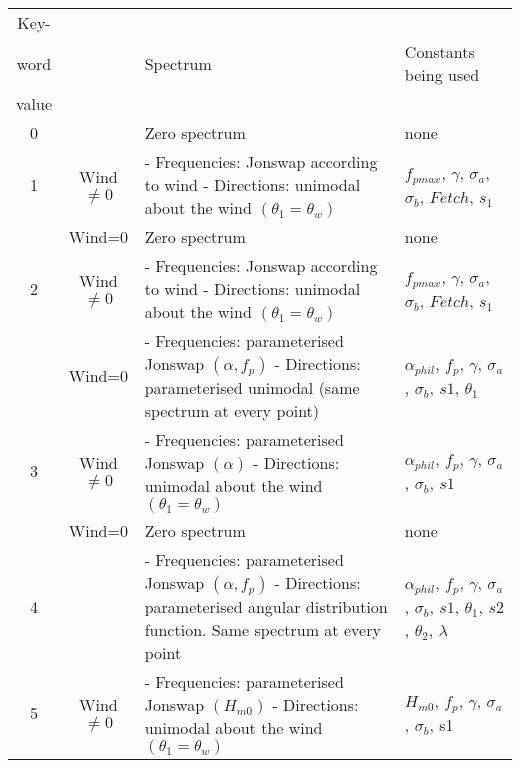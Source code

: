 \begin{table}
\begin{tabular}{|c|c|p{2.2in}|p{1.8in}|} \hline
Key- &  &  &  \\ 
word  &  & Spectrum & Constants  being used \\ 
 value &  & &  \\ \hline
0 &  & Zero spectrum & none \\ \hline
1 & Wind$\ne 0$ & - Frequencies: Jonswap according to wind  \newline - Directions: unimodal about the wind $(\theta_1 = \theta_w)$ & $f_{pmax}$, $ \gamma $, $ \sigma_a$, $ \sigma_b$, $Fetch$, $ s_1 $  \\ \hline
 & Wind=0 & Zero spectrum & none \\ \hline
2 & Wind$\ne 0$ & - Frequencies: Jonswap according to wind \newline - Directions: unimodal about the wind $(\theta_1 = \theta_w)$ & $f_{pmax}$, $ \gamma $, $ \sigma_a$, $ \sigma_b$, $Fetch$, $ s_1 $ \\ \hline
 & Wind=0 & - Frequencies: parameterised Jonswap $(\alpha , f_p)$ \newline - Directions: parameterised unimodal (same spectrum at every point) & $\alpha_{phil}$, $ f_p$, $ \gamma $, $ \sigma_a$, $ \sigma_b$, $ s1$, $ \theta_1$ \\ \hline
3 & Wind$\ne0$ & - Frequencies: parameterised Jonswap $(\alpha)$ \newline - Directions: unimodal about the wind $(\theta_1 = \theta_w)$ & $\alpha_{phil}$, $ f_p$, $ \gamma $, $ \sigma_a$, $ \sigma_b$, $ s1$ \\ \hline
 & Wind=0 & Zero spectrum & none \\ \hline
4 &  & - Frequencies: parameterised Jonswap $(\alpha , f_p)$  \newline  - Directions: parameterised angular distribution function. Same spectrum at every point& $\alpha_{phil}$, $ f_p$, $ \gamma $, $ \sigma_a$, $ \sigma_b$, $ s1$, $ \theta_1$, $ s2$, $ \theta_2$, $ \lambda$ \\ \hline
5 & Wind$\ne 0$ & - Frequencies: parameterised Jonswap $(H_{m0})$ \newline - Directions: unimodal about the wind  $(\theta_1 = \theta_w)$ & $H_{m0}$, $ f_p$, $ \gamma $, $ \sigma_a$, $ \sigma_b$, s1 \\ \hline

\end{tabular}
\end{table}
